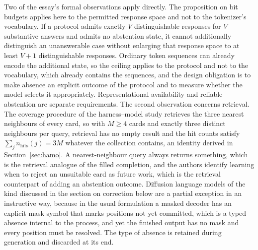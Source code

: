 \documentclass[11pt]{article}
\theoremstyle{remark}
\begin{document}
Two of the essay's formal observations apply directly. The proposition on bit budgets applies here to the permitted response space and not to the tokenizer's vocabulary. If a protocol admits exactly $V$ distinguishable responses for $V$ substantive answers and admits no abstention state, it cannot additionally distinguish an unanswerable case without enlarging that response space to at least $V+1$ distinguishable responses. Ordinary token sequences can already encode the additional state, so the ceiling applies to the protocol and not to the vocabulary, which already contains the sequences, and the design obligation is to make absence an explicit outcome of the protocol and to measure whether the model selects it appropriately. Representational availability and reliable abstention are separate requirements. The second observation concerns retrieval. The coverage procedure of the harness--model study retrieves the three nearest neighbours of every card, so with $M \ge 4$ cards and exactly three distinct neighbours per query, retrieval has no empty result and the hit counts satisfy $\sum_j n_{\mathrm{hits}}(j) = 3M$ whatever the collection contains, an identity derived in Section~\ref{sec:hamo}. A nearest-neighbour query always returns something, which is the retrieval analogue of the filled completion, and the authors identify learning when to reject an unsuitable card as future work, which is the retrieval counterpart of adding an abstention outcome. Diffusion language models of the kind discussed in the section on correction below are a partial exception in an instructive way, because in the usual formulation a masked decoder has an explicit mask symbol that marks positions not yet committed, which is a typed absence internal to the process, and yet the finished output has no mask and every position must be resolved. The type of absence is retained during generation and discarded at its end.
\end{document}
